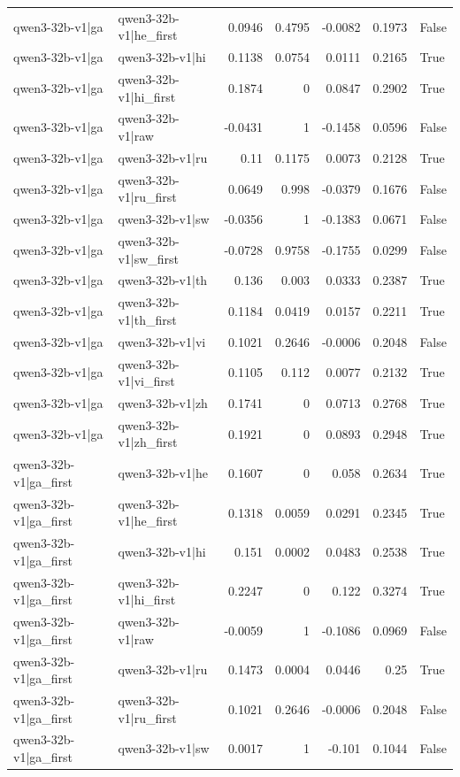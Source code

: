 \begin{table}
\begin{tabular}{l l r r r r l}
qwen3-32b-v1|ga & qwen3-32b-v1|he_first & 0.0946 & 0.4795 & -0.0082 & 0.1973 & False \\
qwen3-32b-v1|ga & qwen3-32b-v1|hi & 0.1138 & 0.0754 & 0.0111 & 0.2165 & True \\
qwen3-32b-v1|ga & qwen3-32b-v1|hi_first & 0.1874 & 0 & 0.0847 & 0.2902 & True \\
qwen3-32b-v1|ga & qwen3-32b-v1|raw & -0.0431 & 1 & -0.1458 & 0.0596 & False \\
qwen3-32b-v1|ga & qwen3-32b-v1|ru & 0.11 & 0.1175 & 0.0073 & 0.2128 & True \\
qwen3-32b-v1|ga & qwen3-32b-v1|ru_first & 0.0649 & 0.998 & -0.0379 & 0.1676 & False \\
qwen3-32b-v1|ga & qwen3-32b-v1|sw & -0.0356 & 1 & -0.1383 & 0.0671 & False \\
qwen3-32b-v1|ga & qwen3-32b-v1|sw_first & -0.0728 & 0.9758 & -0.1755 & 0.0299 & False \\
qwen3-32b-v1|ga & qwen3-32b-v1|th & 0.136 & 0.003 & 0.0333 & 0.2387 & True \\
qwen3-32b-v1|ga & qwen3-32b-v1|th_first & 0.1184 & 0.0419 & 0.0157 & 0.2211 & True \\
qwen3-32b-v1|ga & qwen3-32b-v1|vi & 0.1021 & 0.2646 & -0.0006 & 0.2048 & False \\
qwen3-32b-v1|ga & qwen3-32b-v1|vi_first & 0.1105 & 0.112 & 0.0077 & 0.2132 & True \\
qwen3-32b-v1|ga & qwen3-32b-v1|zh & 0.1741 & 0 & 0.0713 & 0.2768 & True \\
qwen3-32b-v1|ga & qwen3-32b-v1|zh_first & 0.1921 & 0 & 0.0893 & 0.2948 & True \\
qwen3-32b-v1|ga_first & qwen3-32b-v1|he & 0.1607 & 0 & 0.058 & 0.2634 & True \\
qwen3-32b-v1|ga_first & qwen3-32b-v1|he_first & 0.1318 & 0.0059 & 0.0291 & 0.2345 & True \\
qwen3-32b-v1|ga_first & qwen3-32b-v1|hi & 0.151 & 0.0002 & 0.0483 & 0.2538 & True \\
qwen3-32b-v1|ga_first & qwen3-32b-v1|hi_first & 0.2247 & 0 & 0.122 & 0.3274 & True \\
qwen3-32b-v1|ga_first & qwen3-32b-v1|raw & -0.0059 & 1 & -0.1086 & 0.0969 & False \\
qwen3-32b-v1|ga_first & qwen3-32b-v1|ru & 0.1473 & 0.0004 & 0.0446 & 0.25 & True \\
qwen3-32b-v1|ga_first & qwen3-32b-v1|ru_first & 0.1021 & 0.2646 & -0.0006 & 0.2048 & False \\
qwen3-32b-v1|ga_first & qwen3-32b-v1|sw & 0.0017 & 1 & -0.101 & 0.1044 & False \\

\end{tabular}
\end{table}
